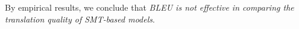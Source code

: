 By empirical results, we conclude that \textit{BLEU is not effective
  in comparing the translation quality of SMT-based models}.





